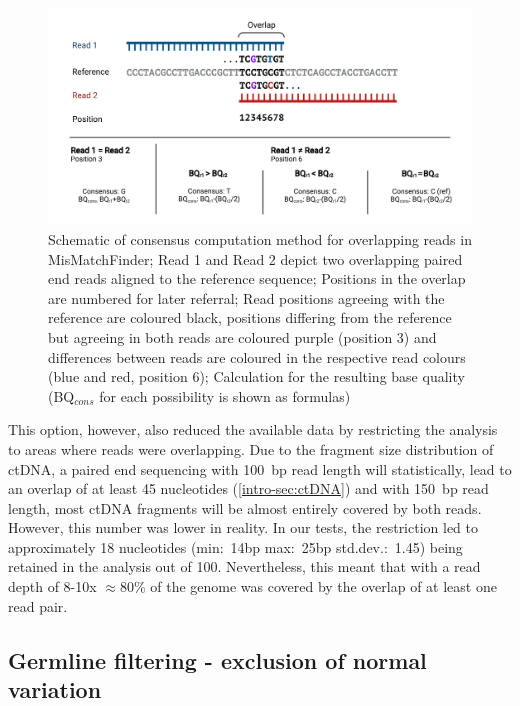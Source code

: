 \begin{figure}[!ht]
\centering
\includegraphics[width=.99\linewidth]{Figures/MisMatchFinder/ConsensusMethodMisMatchFinder.pdf}
\caption[Schematic of consensus computation method for overlapping reads]{Schematic of consensus computation method for overlapping reads in MisMatchFinder; Read 1 and Read 2 depict two overlapping paired end reads aligned to the reference sequence; Positions in the overlap are numbered for later referral; Read positions agreeing with the reference are coloured black, positions differing from the reference but agreeing in both reads are coloured purple (position 3) and differences between reads are coloured in the respective read colours (blue and red, position 6); Calculation for the resulting base quality (BQ$_{cons}$ for each possibility is shown as formulas)}\label{fig:mmf-consensus}
\end{figure}

This option, however, also reduced the available data by restricting the analysis to areas where reads were overlapping. Due to the fragment size distribution of ctDNA, a paired end sequencing with 100~bp read length will statistically, lead to an overlap of at least 45 nucleotides (\autoref{intro-sec:ctDNA}) and with 150~bp read length, most ctDNA fragments will be almost entirely covered by both reads. However, this number was lower in reality.
In our tests, the restriction led to approximately 18 nucleotides (min:~14bp max:~25bp std.dev.:~1.45) being retained in the analysis out of 100. Nevertheless, this meant that with a read depth of 8-10x $\approx$80\% of the genome was covered by the overlap of at least one read pair.



\subsection[Germline filtering]{Germline filtering - exclusion of normal variation}
\label{mmf-sec:germline}

